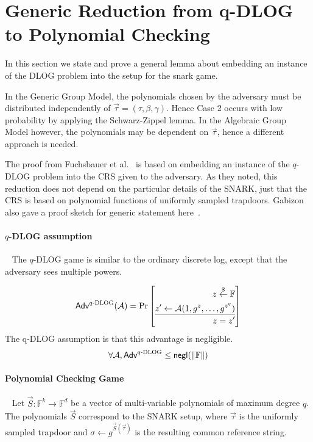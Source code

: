 \documentclass{article}
\theoremstyle{definition}
\theoremstyle{remark}
\newcommand{\F}{\mathbb{F}}
\newcommand{\Adv}{\mathcal{A}}
\newcommand{\samples}{\overset{\$}{\leftarrow}}
\begin{document}
\section{Generic Reduction from q-\textsc{DLOG} to Polynomial Checking}
\label{sec:generic-detail}
In this section we state and prove a general lemma about embedding an instance of the DLOG problem into the setup for the snark game.

In the Generic Group Model, the polynomials chosen by the adversary must be distributed independently of $\vec{\tau} = (\tau, \beta, \gamma)$. Hence Case 2 occurs with low probability by applying the Schwarz-Zippel lemma. In the Algebraic Group Model however, the polynomials may be dependent on $\vec{\tau}$, hence a different approach is needed.

The proof from Fuchsbauer et al.~\cite{fuchsbauer2018algebraic} is based on embedding an instance of the $q$-DLOG problem into the CRS given to the adversary. As they noted, this reduction does not depend on the particular details of the SNARK, just that the CRS is based on polynomial functions of uniformly sampled trapdoors. Gabizon also gave a proof sketch for generic statement here~\cite{generictoagm}.
  
\paragraph{$q$-DLOG assumption}~
The $q$-DLOG game is similar to the ordinary discrete log, except that the adversary sees multiple powers.

\[
\textsf{Adv}^{q\textsc{-DLOG}}(\Adv) =
  \Pr \left[
    \begin{aligned}
    z \samples \F \\
    z' \leftarrow \Adv(1, g^z, \ldots, g^{z^q}) \\
    \hline ~\\[-13pt]
    z = z'
    \end{aligned}
  \right]
  \]
The q-DLOG assumption is that this advantage is negligible.
\[
  \forall \Adv, \textsf{Adv}^{q\textsc{-DLOG}} \le \textsf{negl}(\| \F  \| )
  \]

\paragraph{Polynomial Checking Game}~
Let $\vec{S} : \F^k \rightarrow \F^d$ be a vector of multi-variable polynomials of maximum degree $q$.
The polynomials $\vec{S}$ correspond to the SNARK setup, where $\vec{\tau}$ is the uniformly sampled trapdoor and $\sigma \leftarrow g^{\vec{S}(\vec{\tau})}$ is the resulting common reference string.
\end{document}

